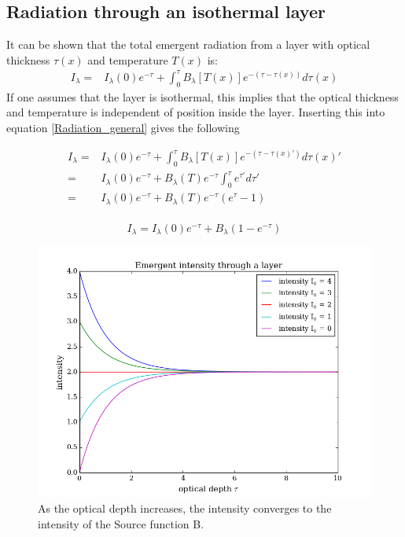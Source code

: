 \documentclass{aa}   %
\begin{document}
\subsection{Radiation through an isothermal layer}
It can be shown that the total emergent radiation from a layer with optical thickness $\tau(x)$ and temperature $T(x)$ is:
\begin{equation}\label{Radiation_general}
\begin{aligned}
 I_{\lambda} =& I_{\lambda}(0)e^{-\tau} + \int_0^\tau B_{\lambda}[T(x)]e^{-(\tau - \tau(x))}d\tau(x)
\end{aligned}
\end{equation}
If one assumes that the layer is isothermal, this implies that the optical thickness and temperature is independent of position inside the layer. Inserting this into equation \ref{Radiation_general} gives the following

\begin{equation*}
\begin{aligned}
I_{\lambda} =& I_{\lambda}(0)e^{-\tau} + \int_0^\tau B_{\lambda}[T(x)]e^{-(\tau - \tau(x)')}d\tau(x)'\\
	    =& I_{\lambda}(0)e^{-\tau} + B_{\lambda}(T)e^{-\tau}\int_0^\tau e^{\tau'}d\tau'\\
	    =& I_{\lambda}(0)e^{-\tau} + B_{\lambda}(T)e^{-\tau}(e^{\tau} - 1)\\
\end{aligned}
\end{equation*}

\begin{equation}\label{Radiation_isothermal}
 I_{\lambda} = I_{\lambda}(0)e^{-\tau} + B_{\lambda}(1 - e^{-\tau})
\end{equation}

\begin{figure}
\includegraphics[width=.49\textwidth]{emergent_original.png}
\caption{As the optical depth increases, the intensity converges to the intensity of the Source function B.}
\label{emergent_original}
\end{figure}
\end{document}
